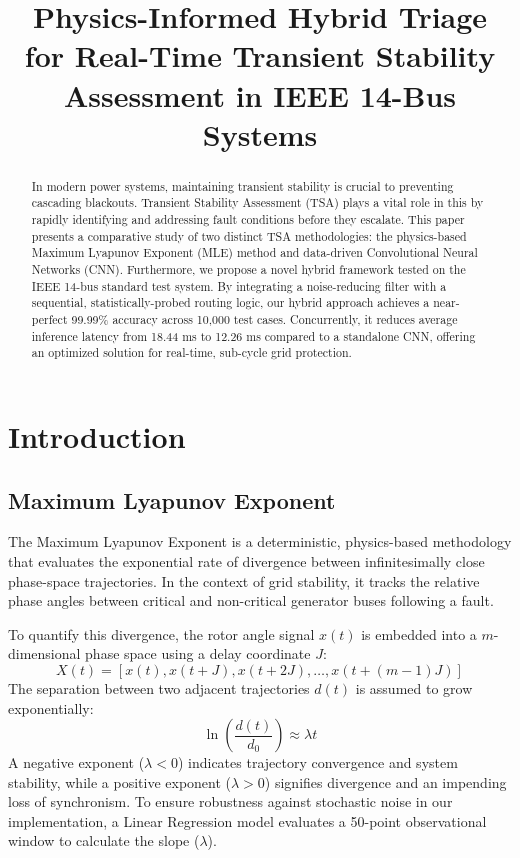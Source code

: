 \documentclass[conference]{IEEEtran}
\begin{document}
\title{Physics-Informed Hybrid Triage for Real-Time Transient Stability Assessment in IEEE 14-Bus Systems}

\author{
\and
{}
\and
{}
}

\maketitle

\begin{abstract}
In modern power systems, maintaining transient stability is crucial to preventing cascading blackouts. Transient Stability Assessment (TSA) plays a vital role in this by rapidly identifying and addressing fault conditions before they escalate. This paper presents a comparative study of two distinct TSA methodologies: the physics-based Maximum Lyapunov Exponent (MLE) method and data-driven Convolutional Neural Networks (CNN). Furthermore, we propose a novel hybrid framework tested on the IEEE 14-bus standard test system. By integrating a noise-reducing filter with a sequential, statistically-probed routing logic, our hybrid approach achieves a near-perfect 99.99\% accuracy across 10,000 test cases. Concurrently, it reduces average inference latency from 18.44 ms to 12.26 ms compared to a standalone CNN, offering an optimized solution for real-time, sub-cycle grid protection.
\end{abstract}

\section{Introduction}

\subsection{Maximum Lyapunov Exponent}
The Maximum Lyapunov Exponent is a deterministic, physics-based methodology that evaluates the exponential rate of divergence between infinitesimally close phase-space trajectories. In the context of grid stability, it tracks the relative phase angles between critical and non-critical generator buses following a fault. 

To quantify this divergence, the rotor angle signal $x(t)$ is embedded into a $m$-dimensional phase space using a delay coordinate $J$:
\begin{equation}
X(t) = [x(t), x(t+J), x(t+2J), \dots, x(t+(m-1)J)]
\end{equation}
The separation between two adjacent trajectories $d(t)$ is assumed to grow exponentially:
\begin{equation}
\ln \left( \frac{d(t)}{d_0} \right) \approx \lambda t
\end{equation}
A negative exponent ($\lambda < 0$) indicates trajectory convergence and system stability, while a positive exponent ($\lambda > 0$) signifies divergence and an impending loss of synchronism. To ensure robustness against stochastic noise in our implementation, a Linear Regression model evaluates a 50-point observational window to calculate the slope ($\lambda$).
\end{document}
